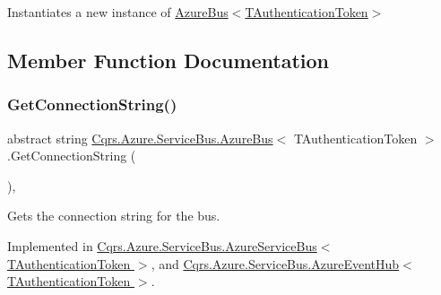 Instantiates a new instance of \hyperlink{classCqrs_1_1Azure_1_1ServiceBus_1_1AzureBus_a1046ff74282fd178f43e28420433d2a9_a1046ff74282fd178f43e28420433d2a9}{Azure\+Bus$<$\+T\+Authentication\+Token$>$} 



\subsection{Member Function Documentation}
\mbox{\label{classCqrs_1_1Azure_1_1ServiceBus_1_1AzureBus_a514e371d5ce093678365af31e6c274e3_a514e371d5ce093678365af31e6c274e3}} 
\subsubsection{\texorpdfstring{Get\+Connection\+String()}{GetConnectionString()}}
{\footnotesize\ttfamily abstract string \hyperlink{classCqrs_1_1Azure_1_1ServiceBus_1_1AzureBus}{Cqrs.\+Azure.\+Service\+Bus.\+Azure\+Bus}$<$ T\+Authentication\+Token $>$.Get\+Connection\+String (\begin{DoxyParamCaption}{ }\end{DoxyParamCaption})\hspace{0.3cm}{\ttfamily [protected]}, {}}



Gets the connection string for the bus. 



Implemented in \hyperlink{classCqrs_1_1Azure_1_1ServiceBus_1_1AzureServiceBus_a5a3b3610dc5dfebe586262c0bc787748_a5a3b3610dc5dfebe586262c0bc787748}{Cqrs.\+Azure.\+Service\+Bus.\+Azure\+Service\+Bus$<$ T\+Authentication\+Token $>$}, and \hyperlink{classCqrs_1_1Azure_1_1ServiceBus_1_1AzureEventHub_a9855633b53ed1f67863ef9dffad0812c_a9855633b53ed1f67863ef9dffad0812c}{Cqrs.\+Azure.\+Service\+Bus.\+Azure\+Event\+Hub$<$ T\+Authentication\+Token $>$}.

\mbox{\label{classCqrs_1_1Azure_1_1ServiceBus_1_1AzureBus_adfed2926ff68eff521e8c64c02cca2a6_adfed2926ff68eff521e8c64c02cca2a6}} 
